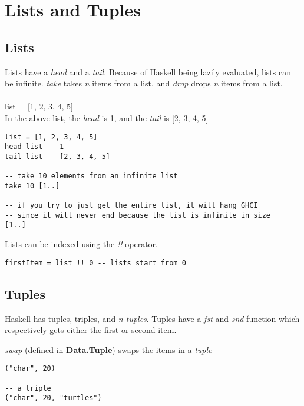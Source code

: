 \section{Lists and Tuples}

\subsection{Lists}
Lists have a \emph{head} and a \emph{tail}. Because of Haskell being lazily evaluated, lists can be infinite.
\emph{take} takes \emph{n} items from a list, and \emph{drop} drops \emph{n} items from a list.\\
\\
list = [1, 2, 3, 4, 5]\\
In the above list, the \emph{head} is \underline{1}, and the \emph{tail} is \underline{[2, 3, 4, 5]}

\begin{lstlisting}
list = [1, 2, 3, 4, 5]
head list -- 1
tail list -- [2, 3, 4, 5]

-- take 10 elements from an infinite list
take 10 [1..]

-- if you try to just get the entire list, it will hang GHCI
-- since it will never end because the list is infinite in size
[1..]
\end{lstlisting}

Lists can be indexed using the \emph{!!} operator. 
\begin{lstlisting}
firstItem = list !! 0 -- lists start from 0    
\end{lstlisting}

\subsection{Tuples}
Haskell has tuples, triples, and \emph{n-tuples}. Tuples have a \emph{fst} and \emph{snd} function which
respectively gets either the first \underline{or} second item. 

\emph{swap} (defined in \textbf{Data.Tuple}) swaps the items in a \emph{tuple}

\begin{lstlisting}
("char", 20)

-- a triple
("char", 20, "turtles")
\end{lstlisting}